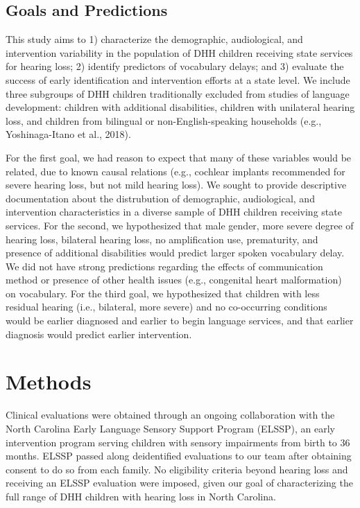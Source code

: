 \documentclass[english,man]{apa6}
\begin{document}
\hypertarget{goals-and-predictions}{%
\subsection{Goals and Predictions}\label{goals-and-predictions}}

This study aims to 1) characterize the demographic, audiological, and intervention variability in the population of DHH children receiving state services for hearing loss; 2) identify predictors of vocabulary delays; and 3) evaluate the success of early identification and intervention efforts at a state level. We include three subgroups of DHH children traditionally excluded from studies of language development: children with additional disabilities, children with unilateral hearing loss, and children from bilingual or non-English-speaking households (e.g., Yoshinaga-Itano et al., 2018).

For the first goal, we had reason to expect that many of these variables would be related, due to known causal relations (e.g., cochlear implants recommended for severe hearing loss, but not mild hearing loss). We sought to provide descriptive documentation about the distrubution of demographic, audiological, and intervention characteristics in a diverse sample of DHH children receiving state services. For the second, we hypothesized that male gender, more severe degree of hearing loss, bilateral hearing loss, no amplification use, prematurity, and presence of additional disabilities would predict larger spoken vocabulary delay. We did not have strong predictions regarding the effects of communication method or presence of other health issues (e.g., congenital heart malformation) on vocabulary. For the third goal, we hypothesized that children with less residual hearing (i.e., bilateral, more severe) and no co-occurring conditions would be earlier diagnosed and earlier to begin language services, and that earlier diagnosis would predict earlier intervention.

\hypertarget{methods}{%
\section{Methods}\label{methods}}

Clinical evaluations were obtained through an ongoing collaboration with the North Carolina Early Language Sensory Support Program (ELSSP), an early intervention program serving children with sensory impairments from birth to 36 months. ELSSP passed along deidentified evaluations to our team after obtaining consent to do so from each family. No eligibility criteria beyond hearing loss and receiving an ELSSP evaluation were imposed, given our goal of characterizing the full range of DHH children with hearing loss in North Carolina.
\end{document}
